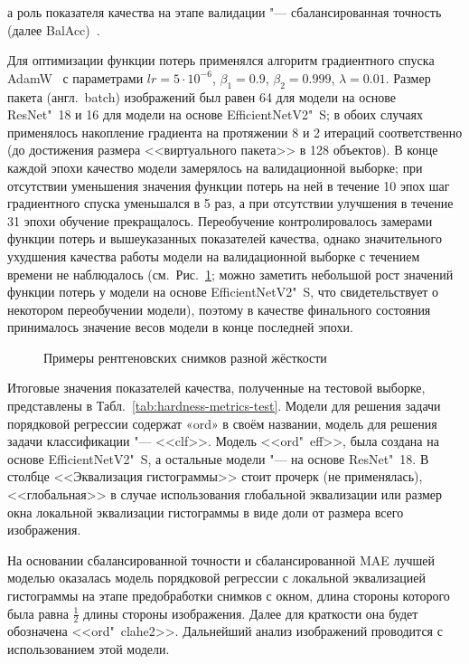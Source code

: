 а роль показателя качества на этапе валидации "--- сбалансированная точность (далее BalAcc)~\cite{brodersen2010balanced}.

Для оптимизации функции потерь применялся алгоритм градиентного спуска AdamW~\cite{loshchilov2018decoupled} с параметрами $lr = 5 \cdot {10}^{-6}$, $\beta_1 = 0.9$, $\beta_2 = 0.999$, $\lambda = 0.01$. Размер пакета (англ.~batch) изображений был равен 64 для модели на основе ResNet"~18 и 16 для модели на основе EfficientNetV2"~S; в обоих случаях применялось накопление градиента на протяжении 8 и 2 итераций соответственно (до достижения размера <<виртуального пакета>> в 128 объектов). В конце каждой эпохи качество модели замерялось на валидационной выборке; при отсутствии уменьшения значения функции потерь на ней в течение 10 эпох шаг градиентного спуска уменьшался в 5 раз, а при отсутствии улучшения в течение 31 эпохи обучение прекращалось. Переобучение контролировалось замерами функции потерь и вышеуказанных показателей качества, однако значительного ухудшения качества работы модели на валидационной выборке с течением времени не наблюдалось (см.~Рис.~\ref{fig:val-losses}; можно заметить небольшой рост значений функции потерь у модели на основе EfficientNetV2"~S, что свидетельствует о некотором переобучении модели), поэтому в качестве финального состояния принималось значение весов модели в конце последней эпохи.

\begin{figure}[ht]
	\caption{Примеры рентгеновских снимков разной жёсткости}
	\label{fig:val-losses}
\end{figure}

Итоговые значения показателей качества, полученные на тестовой выборке, представлены в Табл.~\ref{tab:hardness-metrics-test}. Модели для решения задачи порядковой регрессии содержат «ord» в своём названии, модель для решения задачи классификации "--- <<clf>>. Модель <<ord"~eff>>, была создана на основе EfficientNetV2"~S, а остальные модели "--- на основе ResNet"~18. В столбце <<Эквализация гистограммы>> стоит прочерк (не применялась), <<глобальная>> в случае использования глобальной эквализации или размер окна локальной эквализации гистограммы в виде доли от размера всего изображения.

На основании сбалансированной точности и сбалансированной MAE лучшей моделью оказалась модель порядковой регрессии с локальной эквализацией гистограммы на этапе предобработки снимков с окном, длина стороны которого была равна $\frac{1}{2}$ длины стороны изображения. Далее для краткости она будет обозначена <<ord"~clahe2>>. Дальнейший анализ изображений проводится с использованием этой модели.

